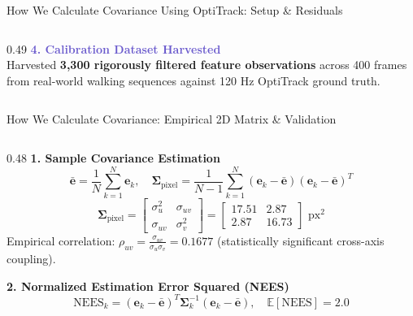 \documentclass[aspectratio=169, 10pt]{beamer}
\begin{document}
\begin{frame}{How We Calculate Covariance Using OptiTrack: Setup \& Residuals}
\begin{columns}[T]
\begin{column}{0.49\textwidth}
      {\small \textbf{\textcolor{SlateBlue}{4. Calibration Dataset Harvested}}}\\
      \scriptsize
      Harvested \textbf{3,300 rigorously filtered feature observations} across 400 frames from real-world walking sequences against 120 Hz OptiTrack ground truth.
    \end{column}
  \end{columns}
\end{frame}

\begin{frame}{How We Calculate Covariance: Empirical 2D Matrix \& Validation}
  \begin{columns}[T]
    \begin{column}{0.48\textwidth}
      {\small \textbf{\textcolor{NavyBlue}{1. Sample Covariance Estimation}}}
      \begin{equation}
        \bar{\mathbf{e}} = \frac{1}{N} \sum_{k=1}^N \mathbf{e}_k, \quad \mathbf{\Sigma}_{\text{pixel}} = \frac{1}{N-1} \sum_{k=1}^N (\mathbf{e}_k - \bar{\mathbf{e}})(\mathbf{e}_k - \bar{\mathbf{e}})^T
      \end{equation}
      \begin{equation}
        \mathbf{\Sigma}_{\text{pixel}} = \begin{bmatrix} \sigma_u^2 & \sigma_{uv} \\ \sigma_{uv} & \sigma_v^2 \end{bmatrix} = \begin{bmatrix} 17.51 & 2.87 \\ 2.87 & 16.73 \end{bmatrix} \text{ px}^2
      \end{equation}
      \scriptsize
      Empirical correlation: $\rho_{uv} = \frac{\sigma_{uv}}{\sigma_u \sigma_v} = \mathbf{0.1677}$ (statistically significant cross-axis coupling).

      \vspace{0.1cm}
      {\small \textbf{\textcolor{NavyBlue}{2. Normalized Estimation Error Squared (NEES)}}}
      \begin{equation}
        \text{NEES}_k = (\mathbf{e}_k - \bar{\mathbf{e}})^T \mathbf{\Sigma}_k^{-1} (\mathbf{e}_k - \bar{\mathbf{e}}), \quad \mathbb{E}[\text{NEES}] = 2.0
      \end{equation}
    \end{column}


\end{columns}
\end{frame}
\end{document}
